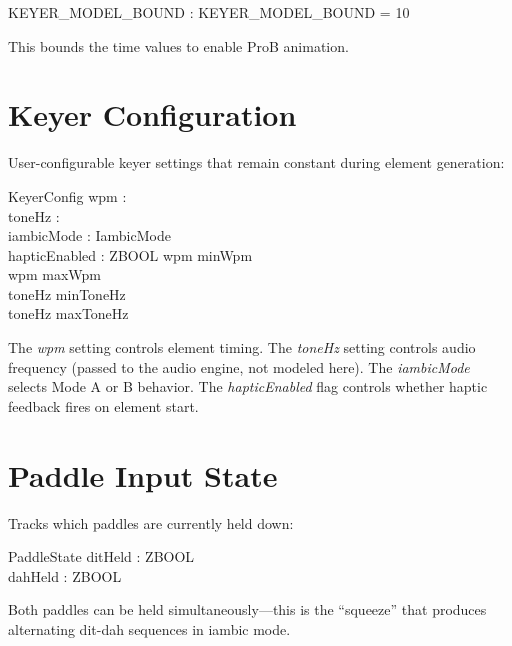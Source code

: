 \documentclass[a4paper,10pt,fleqn]{article}
\begin{document}
\begin{axdef}
KEYER\_MODEL\_BOUND : \nat
\where
KEYER\_MODEL\_BOUND = 10
\end{axdef}

This bounds the time values to enable ProB animation.

\section{Keyer Configuration}

User-configurable keyer settings that remain constant during element generation:

\begin{schema}{KeyerConfig}
wpm : \nat \\
toneHz : \nat \\
iambicMode : IambicMode \\
hapticEnabled : ZBOOL
\where
wpm \geq minWpm \\
wpm \leq maxWpm \\
toneHz \geq minToneHz \\
toneHz \leq maxToneHz
\end{schema}

The \emph{wpm} setting controls element timing. The \emph{toneHz} setting
controls audio frequency (passed to the audio engine, not modeled here).
The \emph{iambicMode} selects Mode A or B behavior. The \emph{hapticEnabled}
flag controls whether haptic feedback fires on element start.

\section{Paddle Input State}

Tracks which paddles are currently held down:

\begin{schema}{PaddleState}
ditHeld : ZBOOL \\
dahHeld : ZBOOL
\end{schema}

Both paddles can be held simultaneously---this is the ``squeeze'' that produces
alternating dit-dah sequences in iambic mode.

\end{document}
